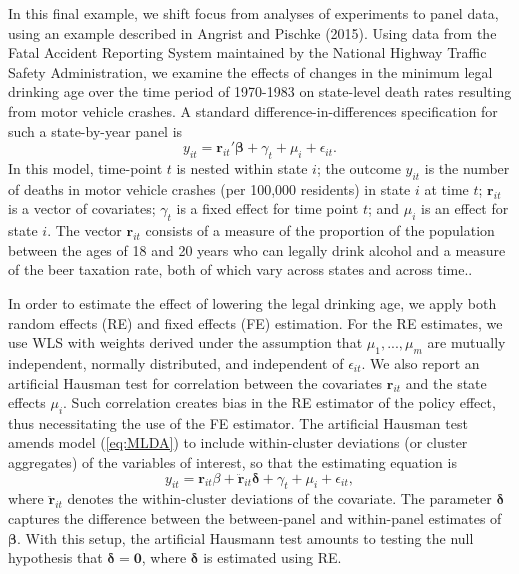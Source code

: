 \documentclass[12pt]{article}\usepackage[]{graphicx}\usepackage[]{color}
\newcommand{\bm}{\mathbf}
\newcommand{\bs}{\boldsymbol}
\begin{document}
In this final example, we shift focus from analyses of experiments to panel data, using an example described in Angrist and Pischke (2015).
Using data from the Fatal Accident Reporting System maintained by the National Highway Traffic Safety Administration, we examine the effects of changes in the minimum legal drinking age over the time period of 1970-1983 on state-level death rates resulting from motor vehicle crashes.
A standard difference-in-differences specification for such a state-by-year panel is
\begin{equation}
\label{eq:MLDA}
y_{it} = \bm{r}_{it}'\bs\beta + \gamma_t + \mu_i + \epsilon_{it}.
\end{equation}
In this model, time-point $t$ is nested within state $i$; the outcome $y_{it}$ is the number of deaths in motor vehicle crashes (per 100,000 residents) in state $i$ at time $t$; $\bm{r}_{it}$ is a vector of covariates; $\gamma_t$ is a fixed effect for time point $t$; and $\mu_i$ is an effect for state $i$. The vector $\bm{r}_{it}$ consists of a measure of the proportion of the population between the ages of 18 and 20 years who can legally drink alcohol and a measure of the beer taxation rate, both of which vary across states and across time.. 

In order to estimate the effect of lowering the legal drinking age, we apply both random effects (RE) and fixed effects (FE) estimation. 
For the RE estimates, we use WLS with weights derived under the assumption that  $\mu_1,...,\mu_m$ are mutually independent, normally distributed, and independent of $\epsilon_{it}$.
We also report an artificial Hausman test \citep{Arellano1993on, Wooldridge2002econometric} for correlation between the covariates $\bm{r}_{it}$ and the state effects $\mu_i$. Such correlation creates bias in the RE estimator of the policy effect, thus necessitating the use of the FE estimator.
The artificial Hausman test amends model (\ref{eq:MLDA}) to include within-cluster deviations (or cluster aggregates) of the variables of interest, so that the estimating equation is
\begin{equation}
y_{it} = \bm{r}_{it}\beta + \bm{\ddot{r}}_{it}\bs\delta + \gamma_t + \mu_i + \epsilon_{it},
\end{equation}
where $\bm{\ddot{r}}_{it}$ denotes the within-cluster deviations of the covariate.
The parameter $\bs\delta$ captures the difference between the between-panel and within-panel estimates of $\bs\beta$. 
With this setup, the artificial Hausmann test amounts to testing the null hypothesis that $\bs\delta = \bm{0}$, where $\bs\delta$ is estimated using RE.  
\end{document}
